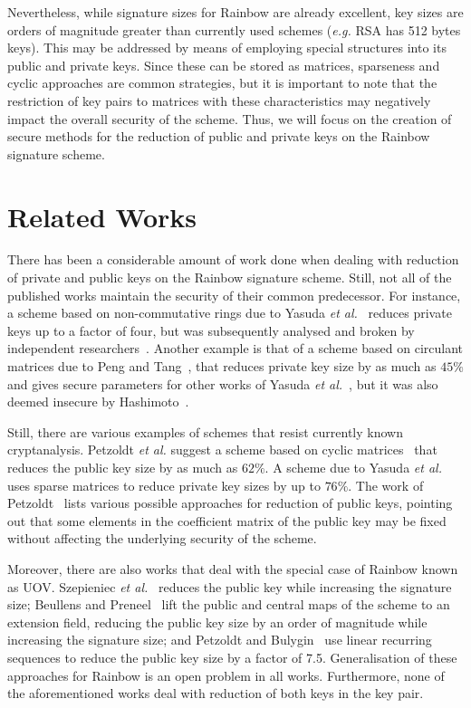 \documentclass[10pt]{article}
\begin{document}
Nevertheless, while signature sizes for Rainbow are already excellent, key sizes are orders of magnitude greater than currently used schemes (\emph{e.g.} RSA has 512 bytes keys). This may be addressed by means of employing special structures into its public and private keys. Since these can be stored as matrices, sparseness and cyclic approaches are common strategies, but it is important to note that the restriction of key pairs to matrices with these characteristics may negatively impact the overall security of the scheme. Thus, we will focus on the creation of secure methods for the reduction of public and private keys on the Rainbow signature scheme.

\section{Related Works}

There has been a considerable amount of work done when dealing with reduction of private and public keys on the Rainbow signature scheme. Still, not all of the published works maintain the security of their common predecessor. For instance, a scheme based on non-commutative rings due to Yasuda \emph{et al.}~\cite{Yasuda:inproc:2012:feb} reduces private keys up to a factor of four, but was subsequently analysed and broken by independent researchers~\cite{Hashimoto:inproc:2013:feb,Thomae:inproc:2012:sep}. Another example is that of a scheme based on circulant matrices due to Peng and Tang~\cite{Peng:article:2017:jun}, that reduces private key size by as much as $45\%$ and gives secure parameters for other works of Yasuda \emph{et al.}~\cite{Yasuda:inproc:2013:may,Yasuda:inproc:2014:apr}, but it was also deemed insecure by Hashimoto~\cite{Hashimoto:misc:2018:oct}. 

Still, there are various examples of schemes that resist currently known cryptanalysis. Petzoldt \emph{et al.} suggest a scheme based on cyclic matrices~\cite{Petzoldt:inproc:2010:dec} that reduces the public key size by as much as $62\%$. A scheme due to Yasuda \emph{et al.}~\cite{Yasuda:article:2014:sep} uses sparse matrices to reduce private key sizes by up to $76\%$. The work of Petzoldt~\cite{Petzoldt:phd:2013:jul} lists various possible approaches for reduction of public keys, pointing out that some elements in the coefficient matrix of the public key may be fixed without affecting the underlying security of the scheme. 

Moreover, there are also works that deal with the special case of Rainbow known as UOV. Szepieniec \emph{et al.}~\cite{Szepieniec:inproc:2017:jun} reduces the public key while increasing the signature size; Beullens and Preneel~\cite{Beullens:inproc:2017:dec} lift the public and central maps of the scheme to an extension field, reducing the public key size by an order of magnitude while increasing the signature size; and Petzoldt and Bulygin~\cite{Petzoldt:inproc:2012:nov} use linear recurring sequences to reduce the public key size by a factor of 7.5. Generalisation of these approaches for Rainbow is an open problem in all works. Furthermore, none of the aforementioned works deal with reduction of both keys in the key pair.
\end{document}
